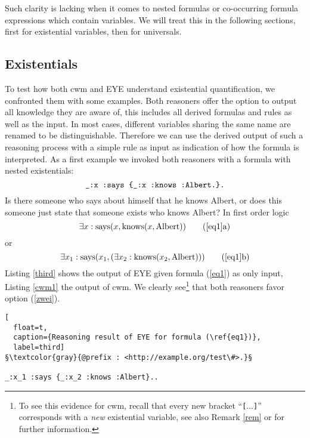 Such clarity is lacking when it comes to nested formulas or co-occurring formula expressions which contain variables. 
We will treat this in the following sections, first for existential variables, then for universals.

\subsection{Existentials}
To test how both cwm and EYE understand existential quantification, we confronted them with some examples.
Both reasoners offer the option to output all knowledge they are aware of, this includes all derived formulas and rules as well as the
input. In most cases, different variables sharing the same name are renamed to be distinguishable. %
Therefore we can use the derived output of such a reasoning process with a simple rule as input as indication of
how the formula is interpreted. As a first example %
we invoked both reasoners with
a formula with nested existentials:
\begin{equation}\label{eq1}
\verb!_:x :says {_:x :knows :Albert.}.!
 \end{equation}
Is there someone who says about himself that he knows Albert, or does this someone just state that someone exists who knows Albert?
In first order logic
\[\exists x : \text{says}(x, \text{knows}(x, \text{Albert})) \tag{\ref{eq1}a}\]
\hspace{6cm} or
\[\exists x_1 : \text{says}(x_1, (\exists x_2: \text{knows}(x_2, \text{Albert})))\tag{\ref{eq1}b} \label{zwei}\]
%
Listing \ref{third} shows the output of EYE given formula (\ref{eq1}) as only input, Listing \ref{cwm1} the output of cwm. 
We clearly see\footnote{To see this evidence 
for cwm, recall that every new bracket ``\texttt{[}$\ldots$\texttt{]}'' corresponds with a \emph{new} existential variable, see also Remark \ref{rem} or \cite{turtle} for further information. }
that both reasoners favor 
option (\ref{zwei}).  
\begin{lstlisting}[
  float=t,
  caption={Reasoning result of EYE for formula (\ref{eq1})},
  label=third]
§\textcolor{gray}{@prefix : <http://example.org/test\#>.}§

_:x_1 :says {_:x_2 :knows :Albert}..

\end{lstlisting}

